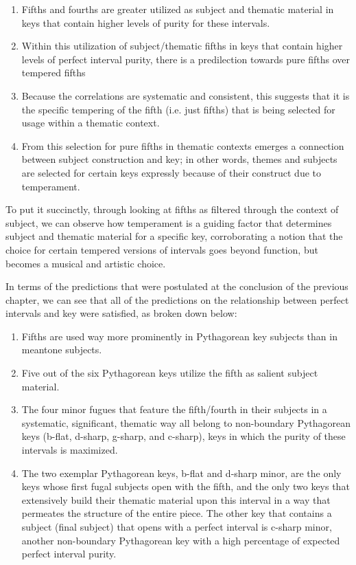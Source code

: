 \begin{enumerate}
\def\labelenumi{\arabic{enumi}.}
\tightlist
\item
  Fifths and fourths are greater utilized as subject and thematic
  material in keys that contain higher levels of purity for these
  intervals.
\item
  Within this utilization of subject/thematic fifths in keys that
  contain higher levels of perfect interval purity, there is a
  predilection towards pure fifths over tempered fifths
\item
  Because the correlations are systematic and consistent, this suggests
  that it is the specific tempering of the fifth (i.e. just fifths) that
  is being selected for usage within a thematic context.
\item
  From this selection for pure fifths in thematic contexts emerges a
  connection between subject construction and key; in other words,
  themes and subjects are selected for certain keys expressly because of
  their construct due to temperament.
\end{enumerate}

To put it succinctly, through looking at fifths as filtered through the
context of subject, we can observe how temperament is a guiding factor
that determines subject and thematic material for a specific key,
corroborating a notion that the choice for certain tempered versions of
intervals goes beyond function, but becomes a musical and artistic
choice.

In terms of the predictions that were postulated at the conclusion of
the previous chapter, we can see that all of the predictions on the
relationship between perfect intervals and key were satisfied, as broken
down below:

\begin{enumerate}
\def\labelenumi{\arabic{enumi}.}
\tightlist
\item
  Fifths are used way more prominently in Pythagorean key subjects than
  in meantone subjects.
\item
  Five out of the six Pythagorean keys utilize the fifth as salient
  subject material.
\item
  The four minor fugues that feature the fifth/fourth in their subjects
  in a systematic, significant, thematic way all belong to non-boundary
  Pythagorean keys (b-flat, d-sharp, g-sharp, and c-sharp), keys in
  which the purity of these intervals is maximized.
\item
  The two exemplar Pythagorean keys, b-flat and d-sharp minor, are the
  only keys whose first fugal subjects open with the fifth, and the only
  two keys that extensively build their thematic material upon this
  interval in a way that permeates the structure of the entire piece.
  The other key that contains a subject (final subject) that opens with
  a perfect interval is c-sharp minor, another non-boundary Pythagorean
  key with a high percentage of expected perfect interval purity.
\end{enumerate}

